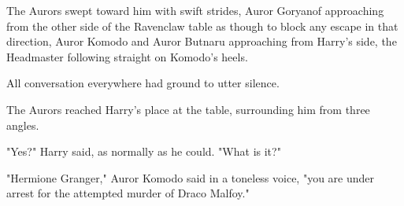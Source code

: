 The Aurors swept toward him with swift strides, Auror Goryanof approaching from 
the other side of the Ravenclaw table as though to block any escape in that 
direction, Auror Komodo and Auror Butnaru approaching from Harry's side, the 
Headmaster following straight on Komodo's heels.

All conversation everywhere had ground to utter silence.

The Aurors reached Harry's place at the table, surrounding him from three 
angles.

"Yes?" Harry said, as normally as he could. "What is it?"

"Hermione Granger," Auror Komodo said in a toneless voice, "you are under 
arrest for the attempted murder of Draco Malfoy."
